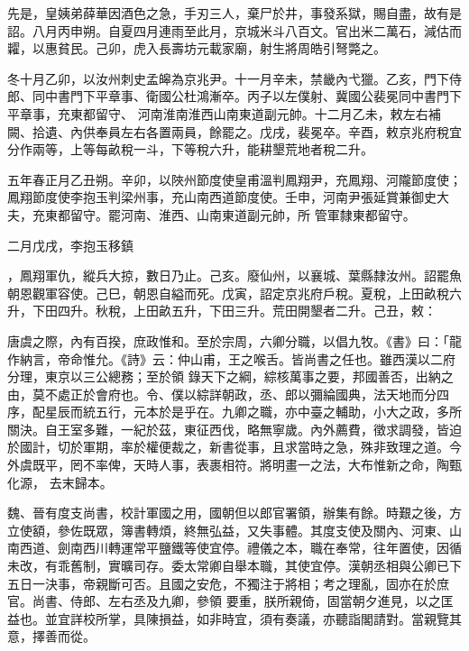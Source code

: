 \begin{pinyinscope}
 先是，皇姨弟薛華因酒色之急，手刃三人，棄尸於井，事發系獄，賜自盡，故有是詔。八月丙申朔。自夏四月連雨至此月，京城米斗八百文。官出米二萬石，減估而糶，以惠貧民。己卯，虎入長壽坊元載家廟，射生將周皓引弩斃之。



 冬十月乙卯，以汝州刺史孟皞為京兆尹。十一月辛未，禁畿內弋獵。乙亥，門下侍郎、同中書門下平章事、衛國公杜鴻漸卒。丙子以左僕射、冀國公裴冕同中書門下平章事，充東都留守、
 河南淮南淮西山南東道副元帥。十二月乙未，敕左右補闕、拾遺、內供奉員左右各置兩員，餘罷之。戊戌，裴冕卒。辛酉，敕京兆府稅宜分作兩等，上等每畝稅一斗，下等稅六升，能耕墾荒地者稅二升。



 五年春正月乙丑朔。辛卯，以陜州節度使皇甫溫判鳳翔尹，充鳳翔、河隴節度使；鳳翔節度使李抱玉判梁州事，充山南西道節度使。壬申，河南尹張延賞兼御史大夫，充東都留守。罷河南、淮西、山南東道副元帥，所
 管軍隸東都留守。



 二月戊戌，李抱玉移鎮



 ，鳳翔軍仇，縱兵大掠，數日乃止。己亥。廢仙州，以襄城、葉縣隸汝州。詔罷魚朝恩觀軍容使。己巳，朝恩自縊而死。戊寅，詔定京兆府戶稅。夏稅，上田畝稅六升，下田四升。秋稅，上田畝五升，下田三升。荒田開墾者二升。己丑，敕：



 唐虞之際，內有百揆，庶政惟和。至於宗周，六卿分職，以倡九牧。《書》曰：「龍作納言，帝命惟允。《詩》云：仲山甫，王之喉舌。皆尚書之任也。雖西漢以二府分理，東京以三公總務；至於領
 錄天下之綱，綜核萬事之要，邦國善否，出納之由，莫不處正於會府也。令、僕以綜詳朝政，丞、郎以彌綸國典，法天地而分四序，配星辰而統五行，元本於是乎在。九卿之職，亦中臺之輔助，小大之政，多所關決。自王室多難，一紀於茲，東征西伐，略無寧歲。內外薦費，徵求調發，皆迫於國計，切於軍期，率於權便裁之，新書從事，且求當時之急，殊非致理之道。今外虞既平，罔不率俾，天時人事，表裹相符。將明畫一之法，大布惟新之命，陶甄化源，
 去末歸本。



 魏、晉有度支尚書，校計軍國之用，國朝但以郎官署領，辦集有餘。時艱之後，方立使額，參佐既眾，簿書轉煩，終無弘益，又失事體。其度支使及關內、河東、山南西道、劍南西川轉運常平鹽鐵等使宜停。禮儀之本，職在奉常，往年置使，因循未改，有乖舊制，實曠司存。委太常卿自舉本職，其使宜停。漢朝丞相與公卿已下五日一決事，帝親斷可否。且國之安危，不獨注于將相；考之理亂，固亦在於庶官。尚書、侍郎、左右丞及九卿，參領
 要重，朕所親倚，固當朝夕進見，以之匡益也。並宜詳校所掌，具陳損益，如非時宜，須有奏議，亦聽詣閣請對。當親覽其意，擇善而從。




\end{pinyinscope}
